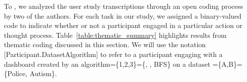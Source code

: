 To , we analyzed the user study transcriptions through an open coding process~\cite{Muller1993} by two of the authors. For each task in our study, we assigned a binary-valued code to indicate whether or not a participant engaged in a particular action or thought process. Table~\ref{table:thematic_summary} highlights results from thematic coding discussed in this section. We will use the notation [Participant.DatasetAlgorithm] to refer to a participant engaging with a dashboard created by an algorithm=\{1,2,3\}=\{\system, \cluster, \textsc{BFS}\} on a dataset =\{A,B\}=\{Police, Autism\}.

